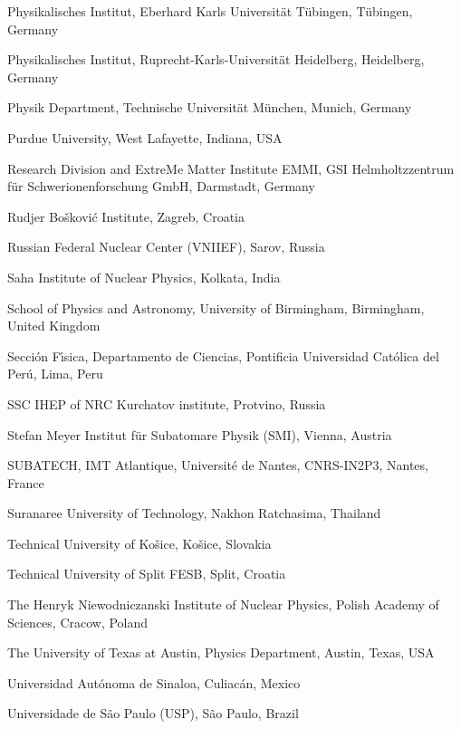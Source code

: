 \begin{flushleft}
\begin{Authlist}
\item {}Physikalisches Institut, Eberhard Karls Universit\"{a}t T\"{u}bingen, T\"{u}bingen, Germany
\item {}Physikalisches Institut, Ruprecht-Karls-Universit\"{a}t Heidelberg, Heidelberg, Germany
\item {}Physik Department, Technische Universit\"{a}t M\"{u}nchen, Munich, Germany
\item {}Purdue University, West Lafayette, Indiana, USA
\item {}Research Division and ExtreMe Matter Institute EMMI, GSI Helmholtzzentrum f\"ur Schwerionenforschung GmbH, Darmstadt, Germany
\item {}Rudjer Bo\v{s}kovi\'{c} Institute, Zagreb, Croatia
\item {}Russian Federal Nuclear Center (VNIIEF), Sarov, Russia
\item {}Saha Institute of Nuclear Physics, Kolkata, India
\item {}School of Physics and Astronomy, University of Birmingham, Birmingham, United Kingdom
\item {}Secci\'{o}n F\'{\i}sica, Departamento de Ciencias, Pontificia Universidad Cat\'{o}lica del Per\'{u}, Lima, Peru
\item {}SSC IHEP of NRC Kurchatov institute, Protvino, Russia
\item {}Stefan Meyer Institut f\"{u}r Subatomare Physik (SMI), Vienna, Austria
\item {}SUBATECH, IMT Atlantique, Universit\'{e} de Nantes, CNRS-IN2P3, Nantes, France
\item {}Suranaree University of Technology, Nakhon Ratchasima, Thailand
\item {}Technical University of Ko\v{s}ice, Ko\v{s}ice, Slovakia
\item {}Technical University of Split FESB, Split, Croatia
\item {}The Henryk Niewodniczanski Institute of Nuclear Physics, Polish Academy of Sciences, Cracow, Poland
\item {}The University of Texas at Austin, Physics Department, Austin, Texas, USA
\item {}Universidad Aut\'{o}noma de Sinaloa, Culiac\'{a}n, Mexico
\item {}Universidade de S\~{a}o Paulo (USP), S\~{a}o Paulo, Brazil

\end{Authlist}
\end{flushleft}
